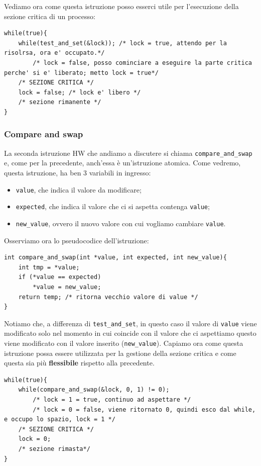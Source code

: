 Vediamo ora come questa istruzione posso esserci utile per l'esecuzione della sezione critica di un processo:
\begin{lstlisting}[caption={Utilizzo \texttt{test\_and\_set}}]
while(true){
    while(test_and_set(&lock)); /* lock = true, attendo per la risolrsa, ora e' occupato.*/
        /* lock = false, posso cominciare a eseguire la parte critica perche' si e' liberato; metto lock = true*/
    /* SEZIONE CRITICA */
    lock = false; /* lock e' libero */ 
    /* sezione rimanente */
}
\end{lstlisting}
% 
\subsubsection{Compare and swap}
La seconda istruzione HW che andiamo a discutere si chiama \texttt{compare\_and\_swap} e, come per la precedente, anch'essa è un'istruzione atomica. Come vedremo, questa istruzione, ha ben 3 variabili in ingresso:
\vspace{-5px}
\begin{itemize}
\setlength{\itemsep}{-.15 em}
    \item \texttt{value}, che indica il valore da modificare;
    \item \texttt{expected}, che indica il valore che ci si aspetta contenga \texttt{value};
    \item \texttt{new\_value}, ovvero il nuovo valore con cui vogliamo cambiare \texttt{value}.
\end{itemize}
Osserviamo ora lo pseudocodice dell'istruzione:
\begin{lstlisting}
int compare_and_swap(int *value, int expected, int new_value){
    int tmp = *value;
    if (*value == expected)
        *value = new_value;
    return temp; /* ritorna vecchio valore di value */
}
\end{lstlisting}
Notiamo che, a differenza di \texttt{test\_and\_set}, in questo caso il valore di \texttt{value} viene modificato solo nel momento in cui coincide con il valore che ci aspettiamo questo viene modificato con il valore inserito (\texttt{new\_value}). Capiamo ora come questa istruzione possa essere utilizzata per la gestione della sezione critica e come questa sia più \textbf{flessibile} rispetto alla precedente.
\begin{lstlisting}[caption={Utilizzo di \texttt{compare\_and\_swap}}]
while(true){
    while(compare_and_swap(&lock, 0, 1) != 0); 
        /* lock = 1 = true, continuo ad aspettare */
        /* lock = 0 = false, viene ritornato 0, quindi esco dal while, e occupo lo spazio, lock = 1 */
    /* SEZIONE CRITICA */
    lock = 0;
    /* sezione rimasta*/
}
\end{lstlisting}

